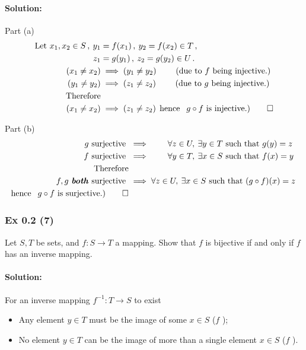 \paragraph{Solution:}{
Part (a)\\
\begin{align*}
\text{Let } x_1, x_2 \in S\,,\: y_1 &= f(x_1)\,,\:  y_2 = f(x_2) \in T\,,\\
                                z_1 &= g(y_1)\,,\:  z_2 = g(y_2) \in U\,.\\
(x_1 \neq x_2)  &\implies  (y_1 \neq y_2)\qquad \text{ (due to } f \text{ being injective.)}\\   
(y_1 \neq y_2)  &\implies  (z_1 \neq z_2)\qquad \text{ (due to } g \text{ being injective.)}\\
\text{Therefore}\\
(x_1 \neq x_2)  &\implies  (z_1 \neq z_2)\:\: \text{hence }\:\: g \circ f \text{ is injective.)} \qed   
\end{align*}

Part (b)\\
\begin{align*}
g \text{ surjective } &\implies \qquad \forall z \in U, \: \exists y \in T \text{ such that } g(y) = z\,\\
f \text{ surjective } &\implies \qquad \forall y \in T, \: \exists x \in S \text{ such that } f(x) = y\,\\
\text{Therefore}\\
f,g \text{ \textit{\textbf{both}} surjective } &\implies \forall z \in U, \: \exists x \in S \text{ such that } (g \circ f)(x) = z\,\\
\text{hence }\:\: g \circ f \text{ is surjective.)} \qed 
\end{align*}

\newpage
\subsubsection{Ex 0.2 (7)}\label{sec:Ex_0.2.7}
Let $S, T$ be sets, and $f : S \rightarrow T$ a mapping.
Show that $f$ is bijective if and only if $f$ has an inverse mapping.

\paragraph{Solution:}{
For an inverse mapping $f^{-1} : T \rightarrow S$ to exist 
\begin{itemize}
\item Any element $y \in T$ must be the image of some $x \in S$ ($f$ );    
\item No  element $y \in T$ can be the image of more than a single element $x \in S$ ($f$ ).
\end{itemize}

}}
